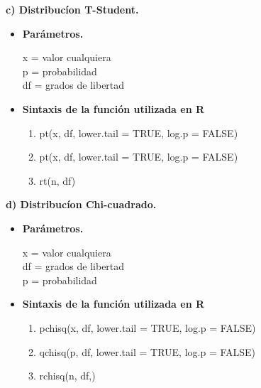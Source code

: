 \documentclass[12pt,letterpaper]{article}\usepackage[]{graphicx}\usepackage[]{color}
\begin{document}
\begin{description}
  \item \textbf{c) Distribuc\'ion T-Student.}
\end{description}
\begin{itemize}
  \item \textbf{Par\'ametros.}
  \begin{center}
x = valor cualquiera\\ 
p = probabilidad\\
df = grados de libertad\\  
\end{center}
\item \textbf{Sintaxis de la funci\'on utilizada en R}
\begin{enumerate}
  \item pt(x, df, lower.tail = TRUE, log.p = FALSE)
  \item pt(x, df, lower.tail = TRUE, log.p = FALSE) 
  \item rt(n, df)   
\end{enumerate}
\end{itemize}

\begin{description}
  \item \textbf{d) Distribuc\'ion Chi-cuadrado.}
\end{description}
\begin{itemize}
  \item \textbf{Par\'ametros.}
  \begin{center}
x = valor cualquiera\\ 
df = grados de libertad\\ 
p = probabilidad\\  
\end{center}
\item \textbf{Sintaxis de la funci\'on utilizada en R}
\begin{enumerate}
  \item pchisq(x, df, lower.tail = TRUE, log.p = FALSE)
  \item qchisq(p, df, lower.tail = TRUE, log.p = FALSE)
  \item rchisq(n, df,)    
\end{enumerate}
\end{itemize}
\end{document}
